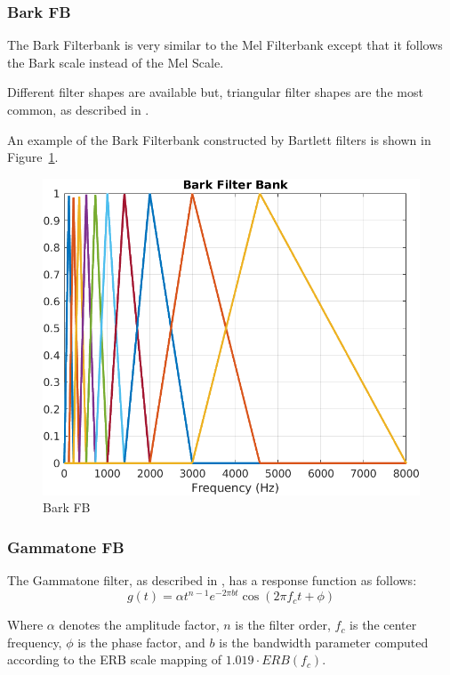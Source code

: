 \subsubsection{Bark FB}
The Bark Filterbank is very similar to the Mel Filterbank
except that it follows the Bark scale 
instead of the Mel Scale.

Different filter shapes are available but, 
triangular filter shapes are the most common,
as described in \cite{barkfilt}.

An example of the Bark Filterbank constructed by Bartlett filters
is shown in Figure~\ref{fig:mat_bark_fb}.
\begin{figure}[H]
    \centering
    \includegraphics[width=0.75\linewidth]{Features/images/mat_bark_fb}
    \caption{Bark FB}\label{fig:mat_bark_fb}
\end{figure}

\subsubsection{Gammatone FB}
The Gammatone filter, as described in \cite{gammatonefilt},
has a response function as follows:
\begin{equation}
    g(t) = \alpha t^{n-1}e^{-2\pi bt}\cos \left( 2\pi f_{c} t + \phi\right)
\end{equation}

Where \(\alpha\) denotes the amplitude factor,
\(n\) is the filter order,
\(f_{c}\) is the center frequency,
\(\phi\) is the phase factor,
and \(b\) is the bandwidth parameter
computed according 
to the ERB scale mapping of \(1.019\cdot ERB \left( f_{c} \right)\).

